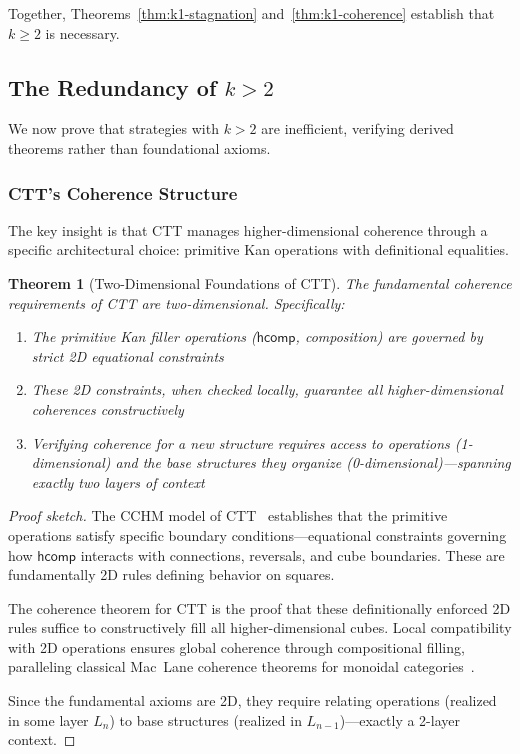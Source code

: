 \documentclass[11pt]{article}
\theoremstyle{definition}
\theoremstyle{plain}
\newtheorem{theorem}{Theorem}
\theoremstyle{remark}
\begin{document}
Together, Theorems~\ref{thm:k1-stagnation} and~\ref{thm:k1-coherence} establish that $k \geq 2$ is necessary.

\subsection{The Redundancy of $k > 2$}

We now prove that strategies with $k > 2$ are inefficient, verifying derived theorems rather than foundational axioms.

\subsubsection{CTT's Coherence Structure}

The key insight is that CTT manages higher-dimensional coherence through a specific architectural choice: primitive Kan operations with definitional equalities.

\begin{theorem}[Two-Dimensional Foundations of CTT]\label{thm:ctt-2d}
The fundamental coherence requirements of CTT are two-dimensional. Specifically:
\begin{enumerate}
\item The primitive Kan filler operations ($\mathsf{hcomp}$, composition) are governed by strict 2D equational constraints
\item These 2D constraints, when checked locally, guarantee all higher-dimensional coherences constructively
\item Verifying coherence for a new structure requires access to operations (1-dimensional) and the base structures they organize (0-dimensional)—spanning exactly two layers of context
\end{enumerate}
\end{theorem}

\begin{proof}[Proof sketch]
The CCHM model of CTT~\cite{cchm} establishes that the primitive operations satisfy specific boundary conditions—equational constraints governing how $\mathsf{hcomp}$ interacts with connections, reversals, and cube boundaries. These are fundamentally 2D rules defining behavior on squares.

The coherence theorem for CTT is the proof that these definitionally enforced 2D rules suffice to constructively fill all higher-dimensional cubes. Local compatibility with 2D operations ensures global coherence through compositional filling, paralleling classical Mac~Lane coherence theorems for monoidal categories~\cite{maclane-coherence}.

Since the fundamental axioms are 2D, they require relating operations (realized in some layer $L_n$) to base structures (realized in $L_{n-1}$)—exactly a 2-layer context.
\end{proof}
\end{document}
